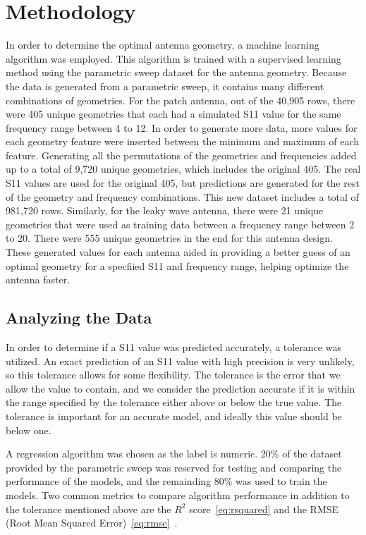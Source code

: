 \documentclass[lettersize,journal]{IEEEtran}
\begin{document}
\section{Methodology}
In order to determine the optimal antenna geometry, a machine learning algorithm was employed. This algorithm is trained with a supervised learning method using the parametric sweep dataset for the antenna geometry. Because the data is generated from a parametric sweep, it contains many different combinations of geometries. For the patch antenna, out of the 40,905 rows, there were 405 unique geometries that each had a simulated S11 value for the same frequency range between 4 to 12. In order to generate more data, more values for each geometry feature were inserted between the minimum and maximum of each feature. Generating all the permutations of the geometries and frequencies added up to a total of 9,720 unique geometries, which includes the original 405. The real S11 values are used for the original 405, but predictions are generated for the rest of the geometry and frequency combinations. This new dataset includes a total of 981,720 rows. Similarly, for the leaky wave antenna, there were 21 unique geometries that were used as training data between a frequency range between 2 to 20. There were 555 unique geometries in the end for this antenna design. These generated values for each antenna aided in providing a better guess of an optimal geometry for a specfiied S11 and frequency range, helping optimize the antenna faster. 

\subsection{Analyzing the Data}
In order to determine if a S11 value was predicted accurately, a tolerance was utilized. An exact prediction of an S11 value with high precision is very unlikely, so this tolerance allows for some flexibility. The tolerance is the error that we allow the value to contain, and we consider the prediction accurate if it is within the range specified by the tolerance either above or below the true value. The tolerance is important for an accurate model, and ideally this value should be below one.

A regression algorithm was chosen as the label is numeric. 20\% of the dataset provided by the parametric sweep was reserved for testing and comparing the performance of the models, and the remainding 80\% was used to train the models. Two common metrics to compare algorithm performance in addition to the tolerance mentioned above are the $R^2$ score~\eqref{eq:rsquared} and the RMSE (Root Mean Squared Error)~\eqref{eq:rmse}~\cite{haque_machine_2023,m_el-kenawy_optimized_2022}. 
\end{document}
